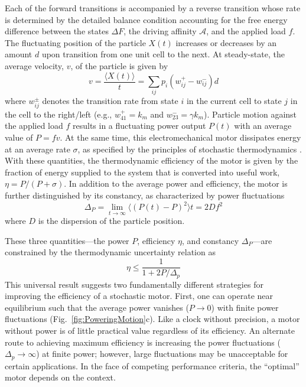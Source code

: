 \begin{appendices}
Each of the forward transitions is accompanied by a reverse transition whose rate is determined by the detailed balance condition accounting for the free energy difference between the states $\Delta F$, the driving affinity $\mathcal{A}$, and the applied load $f$.  The fluctuating position of the particle $X(t)$ increases or decreases by an amount $d$ upon transition from one unit cell to the next. At steady-state, the average velocity, $v$, of the particle is given by 
\begin{equation}
    v = \frac{\langle X(t)\rangle}{t}= \sum_{ij} p_i (w_{ij}^+ - w_{ij}^-)d
\end{equation}
where $w_{ij}^{\pm}$ denotes the transition rate from state $i$ in the current cell to state $j$ in the cell to the right/left (e.g., $w_{41}^+=k_m$ and $w_{23}^-=\gamma k_m$). Particle motion against the applied load $f$ results in a fluctuating power output $P(t)$ with an average value of $P=fv$. At the same time, this electromechanical motor dissipates energy at an average rate $\sigma$, as specified by the principles of stochastic thermodynamics \cite{Pietzonka2016}.  With these quantities, the thermodynamic efficiency of the motor is given by the fraction of energy supplied to the system that is converted into useful work, $\eta = P / (P+\sigma)$. In addition to the average power and efficiency, the motor is further distinguished by its constancy, as characterized by power fluctuations
\begin{equation}
    \Delta_P = \lim_{t\rightarrow \infty}\langle (P(t)-P)^2 \rangle t = 2 D f^2
\end{equation}
where $D$ is the dispersion of the particle position.

These three quantities---the power $P$, efficiency $\eta$, and constancy $\Delta_P$---are constrained by the thermodynamic uncertainty relation \cite{Pietzonka2016} as 
\begin{equation}
    \eta \leq \frac{1}{1+2P/\Delta_p} \label{eq:efficiency}
\end{equation}
This universal result suggests two fundamentally different strategies for improving the efficiency of a stochastic motor.  First, one can operate near equilibrium such that the average power vanishes ($P\rightarrow0$) with finite power fluctuations (Fig.~\ref{fig:PoweringMotion}c).  Like a clock without precision, a motor without power is of little practical value regardless of its efficiency.   An alternate route to achieving maximum efficiency is increasing the power fluctuations ($\Delta_p\rightarrow\infty$) at finite power; however, large fluctuations may be unacceptable for certain applications.  In the face of competing performance criteria, the ``optimal'' motor depends on the context.


\end{appendices}
